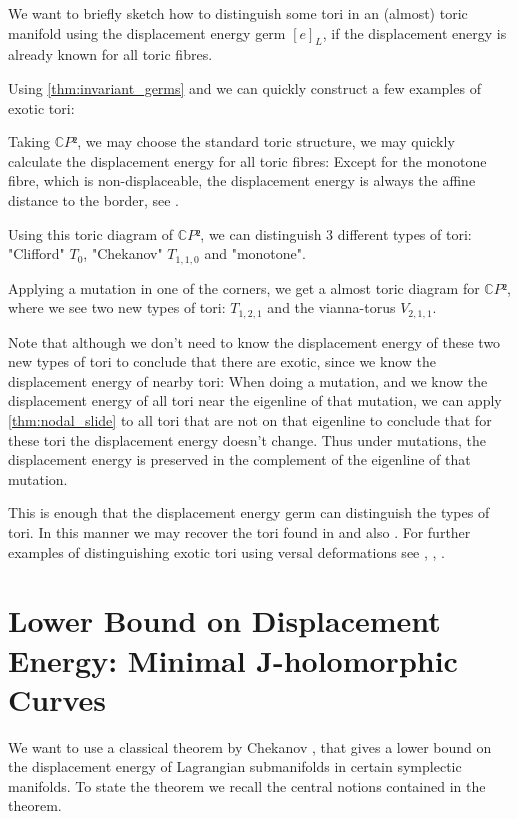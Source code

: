 \documentclass[12pt,a4paper,draft]{scrartcl}
\begin{document}
We want to briefly sketch how to distinguish some tori in an (almost) toric manifold using the displacement energy germ $[e]_L$, if the displacement energy is already known for all toric fibres.

Using \cref{thm:invariant_germs} and  we can quickly construct a few examples of exotic tori:

Taking $ℂP²$, we may choose the standard toric structure, we may quickly calculate the displacement energy for all toric fibres: Except for the monotone fibre, which is non-displaceable, the displacement energy is always the affine distance to the border, see .

Using this toric diagram of $ℂP²$, we can distinguish 3 different types of tori: "Clifford" $T_{0}$, "Chekanov" $T_{1,1,0}$ and "monotone".

Applying a mutation in one of the corners, we get a almost toric diagram for $ℂP²$, where we see two new types of tori: $T_{1,2,1}$ and the vianna-torus $V_{2,1,1}$.

Note that although we don't need to know the displacement energy of these two new types of tori to conclude that there are exotic, since we know the displacement energy of nearby tori:
When doing a mutation, and we know the displacement energy of all tori near the eigenline of that mutation, we can apply \cref{thm:nodal_slide} to all tori that are not on that eigenline to conclude that for these tori the displacement energy doesn't change.
Thus under mutations, the displacement energy is preserved in the complement of the eigenline of that mutation.

This is enough that the displacement energy germ can distinguish the types of tori. In this manner we may recover the tori found in \cite{Via16} and also \cite{Via17}. For further examples of distinguishing exotic tori using versal deformations see \cite{brendel2020real}, \cite{brendel2023hamiltonian}, \cite{brendel2023local}.



\section{Lower Bound on Displacement Energy: Minimal J-holomorphic Curves}
\label{sec:lower_bound}

We want to use a classical theorem by Chekanov \cite{chekanov1998}, that gives a lower bound on the displacement energy of Lagrangian submanifolds in certain symplectic manifolds. To state the theorem we recall the central notions contained in the theorem.
\end{document}
